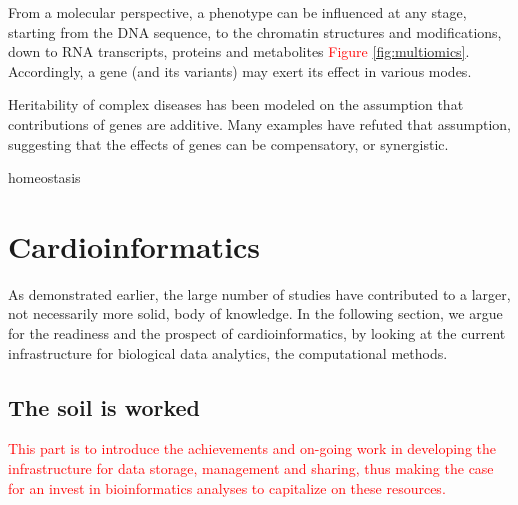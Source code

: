\documentclass[letter]{bioinfo}
\newcommand{\comment}[1]{\textcolor{red}{#1}}
\begin{document}
	
	
	From a molecular perspective, a phenotype can be influenced at any stage, starting from the DNA sequence, to the chromatin structures and modifications, down to RNA transcripts, proteins and metabolites \comment{Figure \ref{fig:multiomics}}. Accordingly, a gene (and its variants) may exert its effect in various modes.
	
	
	Heritability of complex diseases has been modeled on the assumption that contributions of genes are additive. Many examples have refuted that assumption, suggesting that the effects of genes can be compensatory, or synergistic.
	
	homeostasis
	
	
	
	
	

	
	
	
	
	
	\section{Cardioinformatics}
	As demonstrated earlier, the large number of studies have contributed to a larger, not necessarily more solid, body of knowledge. In the following section, we argue for the readiness and the prospect of cardioinformatics, by looking at the current infrastructure for biological data analytics, the computational methods.
	
	\subsection{The soil is worked}
	
	\comment{This part is to introduce the achievements and on-going work in developing the infrastructure for data storage, management and sharing, thus making the case for an invest in bioinformatics analyses to capitalize on these resources.}
	
\end{document}
